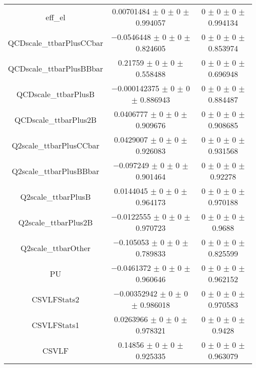 \begin{table}
\begin{tabular}{ccc}
eff\_el 	& \num{0.00701484} $\pm$ \num{0} $\pm$ \num{0} $\pm$ \num{0.994057} 	& \num{0} $\pm$ \num{0} $\pm$ \num{0} $\pm$ \num{0.994134}\\
QCDscale\_ttbarPlusCCbar 	& \num{-0.0546448} $\pm$ \num{0} $\pm$ \num{0} $\pm$ \num{0.824605} 	& \num{0} $\pm$ \num{0} $\pm$ \num{0} $\pm$ \num{0.853974}\\
QCDscale\_ttbarPlusBBbar 	& \num{0.21759} $\pm$ \num{0} $\pm$ \num{0} $\pm$ \num{0.558488} 	& \num{0} $\pm$ \num{0} $\pm$ \num{0} $\pm$ \num{0.696948}\\
QCDscale\_ttbarPlusB 	& \num{-0.000142375} $\pm$ \num{0} $\pm$ \num{0} $\pm$ \num{0.886943} 	& \num{0} $\pm$ \num{0} $\pm$ \num{0} $\pm$ \num{0.884487}\\
QCDscale\_ttbarPlus2B 	& \num{0.0406777} $\pm$ \num{0} $\pm$ \num{0} $\pm$ \num{0.909676} 	& \num{0} $\pm$ \num{0} $\pm$ \num{0} $\pm$ \num{0.908685}\\
Q2scale\_ttbarPlusCCbar 	& \num{0.0429007} $\pm$ \num{0} $\pm$ \num{0} $\pm$ \num{0.926083} 	& \num{0} $\pm$ \num{0} $\pm$ \num{0} $\pm$ \num{0.931568}\\
Q2scale\_ttbarPlusBBbar 	& \num{-0.097249} $\pm$ \num{0} $\pm$ \num{0} $\pm$ \num{0.901464} 	& \num{0} $\pm$ \num{0} $\pm$ \num{0} $\pm$ \num{0.92278}\\
Q2scale\_ttbarPlusB 	& \num{0.0144045} $\pm$ \num{0} $\pm$ \num{0} $\pm$ \num{0.964173} 	& \num{0} $\pm$ \num{0} $\pm$ \num{0} $\pm$ \num{0.970188}\\
Q2scale\_ttbarPlus2B 	& \num{-0.0122555} $\pm$ \num{0} $\pm$ \num{0} $\pm$ \num{0.970723} 	& \num{0} $\pm$ \num{0} $\pm$ \num{0} $\pm$ \num{0.9688}\\
Q2scale\_ttbarOther 	& \num{-0.105053} $\pm$ \num{0} $\pm$ \num{0} $\pm$ \num{0.789833} 	& \num{0} $\pm$ \num{0} $\pm$ \num{0} $\pm$ \num{0.825599}\\
PU 	& \num{-0.0461372} $\pm$ \num{0} $\pm$ \num{0} $\pm$ \num{0.960646} 	& \num{0} $\pm$ \num{0} $\pm$ \num{0} $\pm$ \num{0.962152}\\
CSVLFStats2 	& \num{-0.00352942} $\pm$ \num{0} $\pm$ \num{0} $\pm$ \num{0.986018} 	& \num{0} $\pm$ \num{0} $\pm$ \num{0} $\pm$ \num{0.970583}\\
CSVLFStats1 	& \num{0.0263966} $\pm$ \num{0} $\pm$ \num{0} $\pm$ \num{0.978321} 	& \num{0} $\pm$ \num{0} $\pm$ \num{0} $\pm$ \num{0.9428}\\
CSVLF 	& \num{0.14856} $\pm$ \num{0} $\pm$ \num{0} $\pm$ \num{0.925335} 	& \num{0} $\pm$ \num{0} $\pm$ \num{0} $\pm$ \num{0.963079}\\

\end{tabular}
\end{table}
